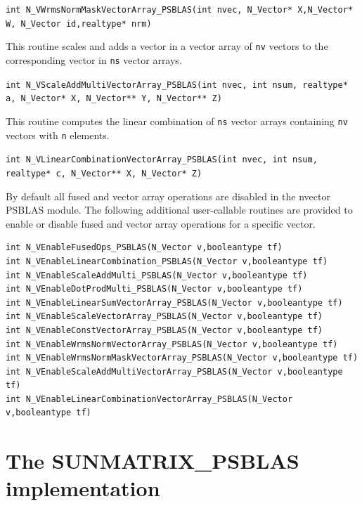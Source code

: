 \documentclass[twoside,a4paper]{refart}
\theoremstyle{definition}
\begin{document}
\begin{description}
 	 \lstinline[style=CStyle]|int N_VWrmsNormMaskVectorArray_PSBLAS(int nvec, N_Vector* X,N_Vector* W, N_Vector id,realtype* nrm)|
 	
 	\item[\fbox{\texttt{N\_VScaleAddMultiVectorArray\_PSBLAS}}] This routine scales and adds a vector in a vector array of
 	\lstinline[style=CStyle]|nv| vectors to the corresponding vector in \lstinline[style=CStyle]|ns| vector arrays.
 	
 	 \lstinline[style=CStyle]|int N_VScaleAddMultiVectorArray_PSBLAS(int nvec, int nsum, realtype* a, N_Vector* X, N_Vector** Y, N_Vector** Z)|
 	
 	\item[\fbox{\texttt{N\_VLinearCombinationVectorArray\_PSBLAS}}] This routine computes the linear combination of \lstinline[style=CStyle]|ns| vector
 	arrays containing \lstinline[style=CStyle]|nv| vectors with \lstinline[style=CStyle]|n| elements.
 	
 	 \lstinline[style=CStyle]|int N_VLinearCombinationVectorArray_PSBLAS(int nvec, int nsum, realtype* c, N_Vector** X, N_Vector* Z)|
\end{description}

By default all fused and vector array operations are disabled in the nvector PSBLAS module.
The following additional user-callable routines are provided to enable or disable fused and vector
array operations for a specific vector.
\begin{lstlisting}[style=CStyle]
int N_VEnableFusedOps_PSBLAS(N_Vector v,booleantype tf)
int N_VEnableLinearCombination_PSBLAS(N_Vector v,booleantype tf)
int N_VEnableScaleAddMulti_PSBLAS(N_Vector v,booleantype tf)
int N_VEnableDotProdMulti_PSBLAS(N_Vector v,booleantype tf)
int N_VEnableLinearSumVectorArray_PSBLAS(N_Vector v,booleantype tf)
int N_VEnableScaleVectorArray_PSBLAS(N_Vector v,booleantype tf)
int N_VEnableConstVectorArray_PSBLAS(N_Vector v,booleantype tf)
int N_VEnableWrmsNormVectorArray_PSBLAS(N_Vector v,booleantype tf)
int N_VEnableWrmsNormMaskVectorArray_PSBLAS(N_Vector v,booleantype tf)
int N_VEnableScaleAddMultiVectorArray_PSBLAS(N_Vector v,booleantype tf)
int N_VEnableLinearCombinationVectorArray_PSBLAS(N_Vector v,booleantype tf)
\end{lstlisting}

\section{The SUNMATRIX\_PSBLAS implementation}\label{sec:sunmatrix}
\end{document}
